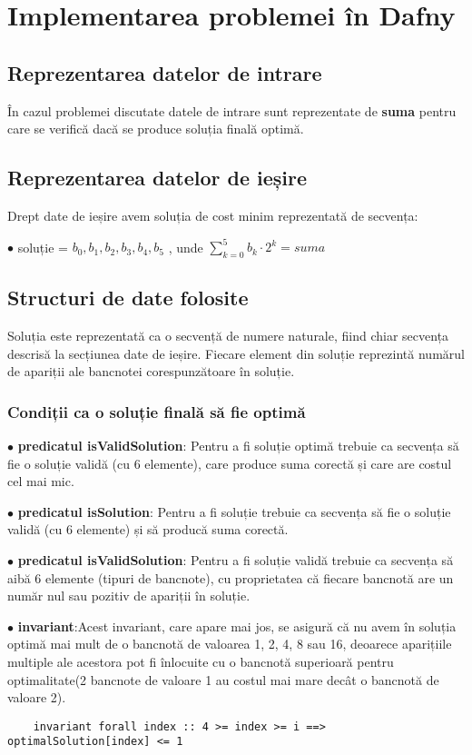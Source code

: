 \chapter{Implementarea problemei în Dafny}


\section{ Reprezentarea datelor de intrare }
În cazul problemei discutate datele de intrare sunt reprezentate de \textbf{suma} 
pentru care se verifică dacă se produce soluția finală optimă.

\section{ Reprezentarea datelor de ieșire}
Drept date de ieșire avem soluția de cost minim reprezentată de secvența: \par
$\bullet$ soluție  = { $b_{0}, b_{1}, b_{2}, b_{3}, b_{4}, b_{5}$} , unde $\sum_{k=0}^{5} b_{k} \cdot 2^{k} = suma $ \cite{jared:1}

\section{ Structuri de date folosite}
Soluția este reprezentată ca o secvență de numere naturale, fiind chiar secvența descrisă la secțiunea date de ieșire.
Fiecare element din soluție reprezintă numărul de apariții ale bancnotei corespunzătoare în soluție. 

\subsection{Condiții ca o soluție finală să fie optimă}
$\bullet$ \textbf{predicatul isValidSolution}: Pentru a fi soluție optimă trebuie ca secvența să fie o soluție validă (cu 6 elemente), 
care produce suma corectă și care are costul cel mai mic.\par
$\bullet$ \textbf{predicatul isSolution}: Pentru a fi soluție trebuie ca secvența să fie o soluție validă (cu 6 elemente) și
să producă suma corectă.\par
$\bullet$ \textbf{predicatul isValidSolution}: Pentru a fi soluție validă trebuie ca secvența să aibă 6 elemente (tipuri de bancnote), cu 
proprietatea că fiecare bancnotă are un număr nul sau pozitiv de apariții în soluție.\par
$\bullet$ \textbf{invariant}:Acest invariant, care apare mai jos, se asigură că 
nu avem în soluția optimă mai mult de o bancnotă de valoarea 1, 2, 4, 8 sau 16, deoarece aparițiile multiple ale acestora pot fi
înlocuite cu o bancnotă superioară pentru optimalitate(2 bancnote de valoare 1 au costul mai mare decât o bancnotă de valoare 2).\par
\begin{lstlisting}
    invariant forall index :: 4 >= index >= i ==> optimalSolution[index] <= 1
\end{lstlisting}


